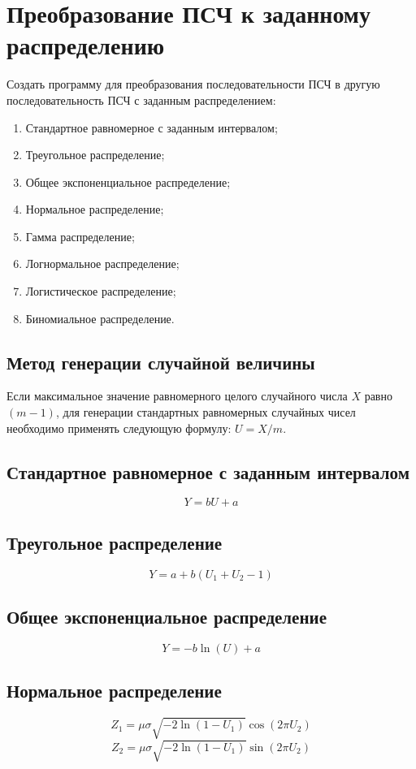 \documentclass[bachelor, och, pract_otchet]{SCWorks}
\begin{document}
\section{Преобразование ПСЧ к заданному распределению}
Создать программу для преобразования последовательности ПСЧ в другую последовательность
ПСЧ с заданным распределением:
\begin{enumerate}
  \item Стандартное равномерное с заданным интервалом;
  \item Треугольное распределение;
  \item Общее экспоненциальное распределение;
  \item Нормальное распределение;
  \item Гамма распределение;
  \item Логнормальное распределение;
  \item Логистическое распределение;
  \item Биномиальное распределение.
\end{enumerate}

\subsection{Метод генерации случайной величины}
Если максимальное значение равномерного целого случайного числа $X$
равно $(m - 1)$, для генерации стандартных равномерных случайных чисел 
необходимо применять следующую формулу: $U = X / m$.

\subsection{Стандартное равномерное с заданным интервалом}
\[ Y = bU + a \]

\subsection{Треугольное распределение}
\[ Y = a + b(U_1 + U_2 - 1) \]

\subsection{Общее экспоненциальное распределение}
\[ Y = -b \ln(U) + a \]

\subsection{Нормальное распределение}
\[ Z_1 = \mu \sigma \sqrt{-2 \ln(1 - U_1)} \cos(2 \pi U_2) \]
\[ Z_2 = \mu \sigma \sqrt{-2 \ln(1 - U_1)} \sin(2 \pi U_2) \]
\end{document}
